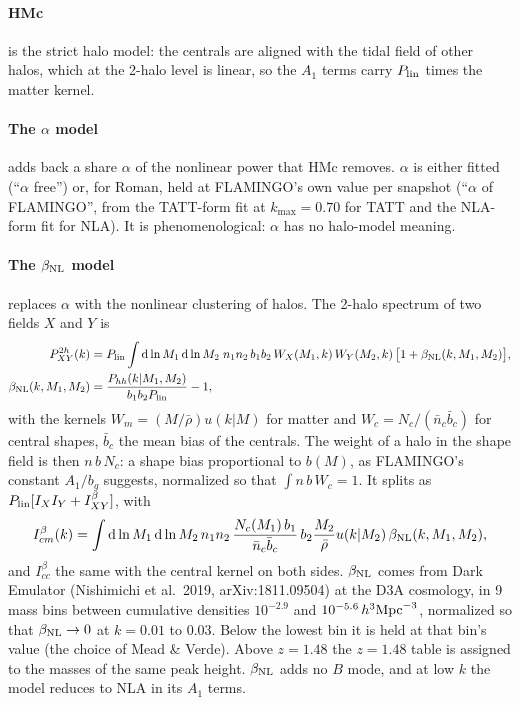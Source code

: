 \documentclass[11pt]{article}
\newcommand{\Plin}{P_{\rm lin}}
\newcommand{\bNL}{\beta_{\rm NL}}
\newcommand{\Ib}[1]{I^{\beta}_{#1}}
\newcommand{\dd}{\mathrm{d}}
\newcommand{\kmax}{k_{\max}}
\newcommand{\ZEmu}{1.48}           %
\begin{document}
\paragraph{HMc} is the strict halo model: the centrals are aligned with the
tidal field of other halos, which at the 2-halo level is linear, so the
$A_1$ terms carry $\Plin$ times the matter kernel.

\paragraph{The $\alpha$ model} adds back a share $\alpha$ of the nonlinear
power that HMc removes. $\alpha$ is either fitted (``$\alpha$ free'') or, for
Roman, held at FLAMINGO's own value per snapshot (``$\alpha$ of FLAMINGO'',
from the TATT-form fit at $\kmax = 0.70$ for TATT and the NLA-form fit for
NLA). It is phenomenological: $\alpha$ has no halo-model meaning.

\paragraph{The $\bNL$ model} replaces $\alpha$ with the nonlinear clustering
of halos. The 2-halo spectrum of two fields $X$ and $Y$ is
\begin{align}
P^{2h}_{XY}(k) &= \Plin\int\dd\ln M_1\,\dd\ln M_2\;n_1n_2\,b_1b_2\,
W_X(M_1,k)\,W_Y(M_2,k)\,\big[1 + \bNL(k, M_1, M_2)\big],\label{eq:2h}\\
\bNL(k, M_1, M_2) &= \frac{P_{hh}(k|M_1,M_2)}{b_1b_2\Plin} - 1,\nonumber
\end{align}
with the kernels $W_m = (M/\bar\rho)u(k|M)$ for matter and
$W_c = N_c/(\bar n_c\bar b_c)$ for central shapes, $\bar b_c$ the mean bias of
the centrals. The weight of a halo in the shape field is then $n\,b\,N_c$: a
shape bias proportional to $b(M)$, as FLAMINGO's constant $A_1/b_g$ suggests,
normalized so that $\int n\,b\,W_c = 1$. It splits as
$\Plin[I_XI_Y + \Ib{XY}]$, with
\begin{equation}
\Ib{cm}(k) = \int\dd\ln M_1\,\dd\ln M_2\,n_1n_2\,
\frac{N_c(M_1)\,b_1}{\bar n_c\bar b_c}\,b_2\frac{M_2}{\bar\rho}u(k|M_2)\,\bNL(k,M_1,M_2),
\end{equation}
and $\Ib{cc}$ the same with the central kernel on both sides. $\bNL$ comes
from Dark Emulator (Nishimichi et al.\ 2019, arXiv:1811.09504) at the D3A
cosmology, in 9 mass bins between cumulative densities $10^{-2.9}$ and
$10^{-5.6}\,h^3{\rm Mpc}^{-3}$, normalized so that $\bNL \to 0$ at
$k = 0.01$ to 0.03. Below the lowest bin it is held at that bin's value (the
choice of Mead \& Verde). Above $z = \ZEmu$ the $z = \ZEmu$ table is assigned
to the masses of the same peak height. $\bNL$ adds no $B$ mode, and at low
$k$ the model reduces to NLA in its $A_1$ terms.
\end{document}

